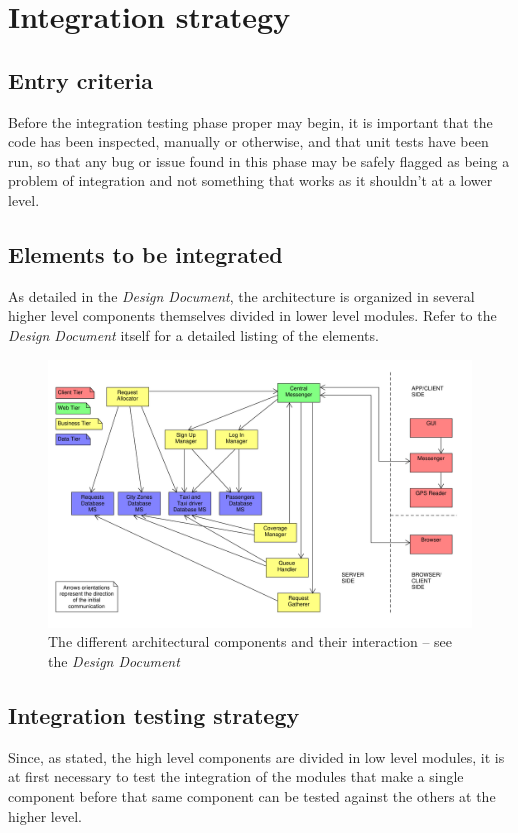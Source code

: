\chapter{Integration strategy}


\section{Entry criteria}
Before the integration testing phase proper may begin, it is important that the code has been inspected, manually or otherwise, and that unit tests have been run, so that any bug or issue found in this phase may be safely flagged as being a problem of integration and not something that works as it shouldn't at a lower level.


\section{Elements to be integrated}
As detailed in the \emph{Design Document}, the architecture is organized in several higher level components themselves divided in lower level modules. Refer to the \emph{Design Document} itself for a detailed listing of the elements.
\begin{figure}
\centering
\includegraphics[width=\textwidth]{tex-images/interactions}
\caption{The different architectural components and their interaction -- see the \emph{Design Document}}
\end{figure}


\section{Integration testing strategy}
Since, as stated, the high level components are divided in low level modules, it is at first necessary to test the integration of the modules that make a single component before that same component can be tested against the others at the higher level.

